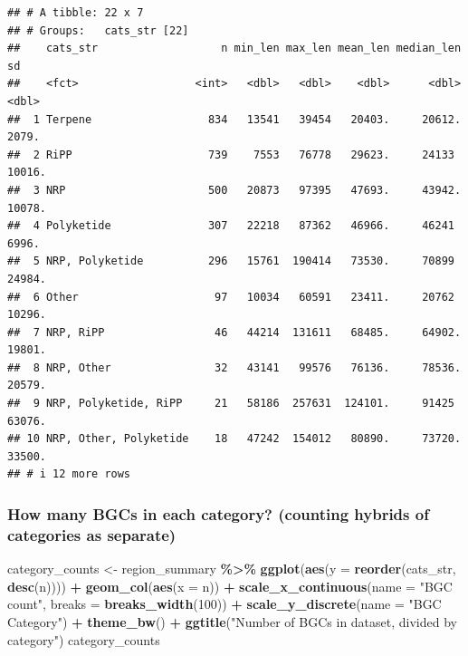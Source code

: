 \documentclass[
]{article}
\newenvironment{Shaded}{\begin{snugshade}}{\end{snugshade}}
\newcommand{\AttributeTok}[1]{\textcolor[rgb]{0.13,0.29,0.53}{#1}}
\newcommand{\DecValTok}[1]{\textcolor[rgb]{0.00,0.00,0.81}{#1}}
\newcommand{\FunctionTok}[1]{\textcolor[rgb]{0.13,0.29,0.53}{\textbf{#1}}}
\newcommand{\NormalTok}[1]{#1}
\newcommand{\OtherTok}[1]{\textcolor[rgb]{0.56,0.35,0.01}{#1}}
\newcommand{\SpecialCharTok}[1]{\textcolor[rgb]{0.81,0.36,0.00}{\textbf{#1}}}
\newcommand{\StringTok}[1]{\textcolor[rgb]{0.31,0.60,0.02}{#1}}
\begin{document}
\begin{verbatim}
## # A tibble: 22 x 7
## # Groups:   cats_str [22]
##    cats_str                   n min_len max_len mean_len median_len     sd
##    <fct>                  <int>   <dbl>   <dbl>    <dbl>      <dbl>  <dbl>
##  1 Terpene                  834   13541   39454   20403.     20612.  2079.
##  2 RiPP                     739    7553   76778   29623.     24133  10016.
##  3 NRP                      500   20873   97395   47693.     43942. 10078.
##  4 Polyketide               307   22218   87362   46966.     46241   6996.
##  5 NRP, Polyketide          296   15761  190414   73530.     70899  24984.
##  6 Other                     97   10034   60591   23411.     20762  10296.
##  7 NRP, RiPP                 46   44214  131611   68485.     64902. 19801.
##  8 NRP, Other                32   43141   99576   76136.     78536. 20579.
##  9 NRP, Polyketide, RiPP     21   58186  257631  124101.     91425  63076.
## 10 NRP, Other, Polyketide    18   47242  154012   80890.     73720. 33500.
## # i 12 more rows
\end{verbatim}

\hypertarget{how-many-bgcs-in-each-category-counting-hybrids-of-categories-as-separate}{%
\subsubsection{How many BGCs in each category? (counting hybrids of
categories as
separate)}\label{how-many-bgcs-in-each-category-counting-hybrids-of-categories-as-separate}}

\begin{Shaded}
\begin{Highlighting}[]
\NormalTok{category\_counts }\OtherTok{\textless{}{-}}\NormalTok{ region\_summary }\SpecialCharTok{\%\textgreater{}\%}
  \FunctionTok{ggplot}\NormalTok{(}\FunctionTok{aes}\NormalTok{(}\AttributeTok{y =} \FunctionTok{reorder}\NormalTok{(cats\_str, }\FunctionTok{desc}\NormalTok{(n)))) }\SpecialCharTok{+}
  \FunctionTok{geom\_col}\NormalTok{(}\FunctionTok{aes}\NormalTok{(}\AttributeTok{x =}\NormalTok{ n)) }\SpecialCharTok{+}
  \FunctionTok{scale\_x\_continuous}\NormalTok{(}\AttributeTok{name =} \StringTok{"BGC count"}\NormalTok{, }\AttributeTok{breaks =} \FunctionTok{breaks\_width}\NormalTok{(}\DecValTok{100}\NormalTok{)) }\SpecialCharTok{+}
  \FunctionTok{scale\_y\_discrete}\NormalTok{(}\AttributeTok{name =} \StringTok{"BGC Category"}\NormalTok{) }\SpecialCharTok{+}
  \FunctionTok{theme\_bw}\NormalTok{() }\SpecialCharTok{+}
  \FunctionTok{ggtitle}\NormalTok{(}\StringTok{"Number of BGCs in dataset, divided by category"}\NormalTok{)}
\NormalTok{category\_counts}
\end{Highlighting}
\end{Shaded}
\end{document}
